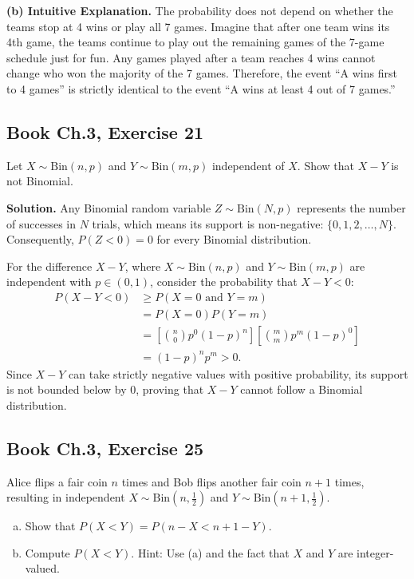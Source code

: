 \documentclass[11pt,a4paper]{article}
\begin{document}
\vspace{4pt}
\noindent \textbf{(b) Intuitive Explanation.} The probability does not depend on whether the teams stop at 4 wins or play all 7 games. Imagine that after one team wins its 4th game, the teams continue to play out the remaining games of the 7-game schedule just for fun. Any games played after a team reaches 4 wins cannot change who won the majority of the 7 games. Therefore, the event ``A wins first to 4 games'' is strictly identical to the event ``A wins at least 4 out of 7 games.''

\vspace{10pt}
\subsection{Book Ch.3, Exercise 21}
\begin{tcolorbox}[title={Book Ch.3, Exercise 21}]
Let $X \sim \text{Bin}(n, p)$ and $Y \sim \text{Bin}(m, p)$ independent of $X$. Show that $X - Y$ is not Binomial.
\end{tcolorbox}

\noindent \textbf{Solution.} Any Binomial random variable $Z \sim \text{Bin}(N, p)$ represents the number of successes in $N$ trials, which means its support is non-negative: $\{0, 1, 2, \dots, N\}$. Consequently, $P(Z < 0) = 0$ for every Binomial distribution. 

For the difference $X - Y$, where $X \sim \text{Bin}(n, p)$ and $Y \sim \text{Bin}(m, p)$ are independent with $p \in (0,1)$, consider the probability that $X - Y < 0$:
\begin{align*}
P(X - Y < 0) &\ge P(X = 0 \text{ and } Y = m) \\
&= P(X = 0) P(Y = m) \\
&= \left[ \binom{n}{0} p^0 (1-p)^n \right] \left[ \binom{m}{m} p^m (1-p)^0 \right] \\
&= (1-p)^n p^m > 0.
\end{align*}
Since $X - Y$ can take strictly negative values with positive probability, its support is not bounded below by $0$, proving that $X - Y$ cannot follow a Binomial distribution.

\vspace{10pt}
\subsection{Book Ch.3, Exercise 25}
\begin{tcolorbox}[title={Book Ch.3, Exercise 25}]
Alice flips a fair coin $n$ times and Bob flips another fair coin $n+1$ times, resulting in independent $X \sim \text{Bin}\left(n, \frac{1}{2}\right)$ and $Y \sim \text{Bin}\left(n+1, \frac{1}{2}\right)$.
\begin{enumerate}[(a)]
\item Show that $P(X < Y) = P(n - X < n + 1 - Y)$.
\item Compute $P(X < Y)$.
Hint: Use (a) and the fact that $X$ and $Y$ are integer-valued.
\end{enumerate}
\end{tcolorbox}
\end{document}
